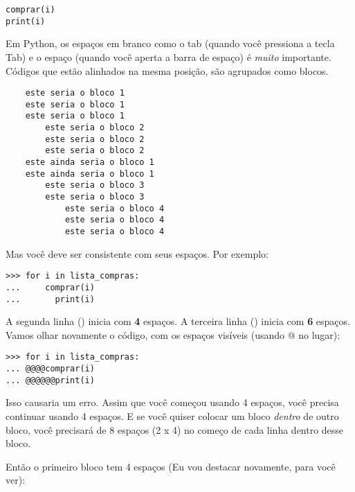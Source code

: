 \begin{listingignore}
\begin{verbatim}
comprar(i)
print(i)
\end{verbatim}
\end{listingignore}

Em Python, os espaços em branco como o tab (quando você pressiona a tecla Tab) e o espaço (quando você aperta a barra de espaço) é \emph{muito} importante. Códigos que estão alinhados na mesma posição, são agrupados como blocos.

\begin{listing}
\begin{verbatim}
	este seria o bloco 1
	este seria o bloco 1
	este seria o bloco 1
	    este seria o bloco 2
	    este seria o bloco 2
	    este seria o bloco 2
	este ainda seria o bloco 1
	este ainda seria o bloco 1
	    este seria o bloco 3
	    este seria o bloco 3
	        este seria o bloco 4
	        este seria o bloco 4
	        este seria o bloco 4
\end{verbatim}
\end{listing}

Mas você deve ser consistente com seus espaços. Por exemplo:

\begin{listingignore}
\begin{verbatim}
>>> for i in lista_compras:
...     comprar(i)
...       print(i)
\end{verbatim}
\end{listingignore}

A segunda linha () inicia com \textbf{4} espaços. A terceira linha () inicia com \textbf{6} espaços.  Vamos olhar novamente o código, com os espaços visíveis (usando @ no lugar):

\begin{listingignore}
\begin{verbatim}
>>> for i in lista_compras:
... @@@@comprar(i)
... @@@@@@print(i)
\end{verbatim}
\end{listingignore}

Isso causaria um erro. Assim que você começou usando 4 espaços, você precisa continuar usando 4 espaços. E se você quiser colocar um bloco \emph{dentro} de outro bloco, você precisará de 8 espaços (2 x 4) no começo de cada linha dentro desse bloco.
\par
Então o primeiro bloco tem 4 espaços (Eu vou destacar novamente, para você ver):

